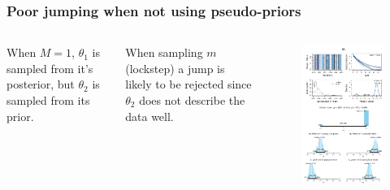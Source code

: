 \documentclass[usenames,dvipsnames,table]{beamer}
\begin{document}
\begin{frame}
\frametitle{Poor jumping when not using pseudo-priors}
\begin{columns}[c]

When $M=1$, $\theta_1$ is sampled from it's posterior, but $\theta_2$ is sampled from its prior.

\vspace{1em}
When sampling $m$ (lockstep) a jump is likely to be rejected since $\theta_2$ does not describe the data well.

\begin{figure}
\centering
\includegraphics[height=.8\textheight]{img/fig10_5}
\end{figure}
\end{columns}
\end{frame}
\end{document}
